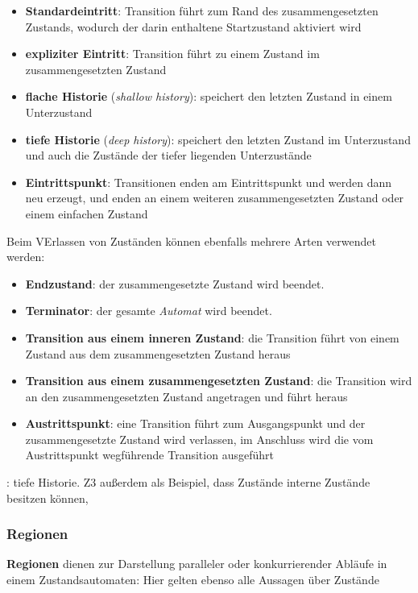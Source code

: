 \begin{itemize}
    \item \textbf{Standardeintritt}: Transition führt zum Rand des zusammengesetzten Zustands, wodurch der darin enthaltene Startzustand aktiviert wird
    \item \textbf{expliziter Eintritt}: Transition führt zu einem Zustand im zusammengesetzten Zustand
    \item \textbf{flache Historie} (\textit{shallow history}): speichert den letzten Zustand in einem Unterzustand
    \item \textbf{tiefe Historie} (\textit{deep history}): speichert den letzten Zustand im Unterzustand und auch die Zustände der tiefer liegenden Unterzustände
    \item \textbf{Eintrittspunkt}: Transitionen enden am Eintrittspunkt und werden dann neu erzeugt, und enden an einem weiteren zusammengesetzten Zustand oder einem einfachen Zustand
\end{itemize}

\noindent
Beim VErlassen von Zuständen können ebenfalls mehrere Arten verwendet werden:

\begin{itemize}
    \item \textbf{Endzustand}: der zusammengesetzte Zustand wird beendet.
    \item \textbf{Terminator}: der gesamte \textit{Automat} wird beendet.
    \item \textbf{Transition aus einem inneren Zustand}: die Transition führt von einem Zustand aus dem zusammengesetzten Zustand heraus
    \item \textbf{Transition aus einem zusammengesetzten Zustand}: die Transition wird an den zusammengesetzten Zustand angetragen und führt heraus
    \item \textbf{Austrittspunkt}: eine Transition führt zum Ausgangspunkt und der zusammengesetzte Zustand wird verlassen, im Anschluss wird die vom Austrittspunkt wegführende Transition ausgeführt
\end{itemize}


\begin{tcolorbox}[colback=yellow!20]
\cite[Abb. 6.11.7, 342]{Bal05}: tiefe Historie. Z3 außerdem als Beispiel, dass Zustände interne Zustände besitzen können,
\end{tcolorbox}

\subsubsection*{Regionen}
\textbf{Regionen} dienen zur Darstellung paralleler oder konkurrierender Abläufe in einem Zustandsautomaten: Hier gelten ebenso alle Aussagen über Zustände


